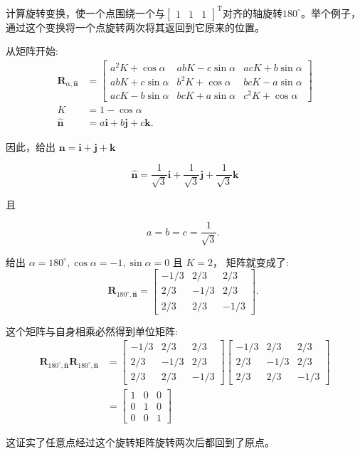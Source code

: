 \begin{example}
    计算旋转变换，使一个点围绕一个与$\left[\begin{array}{lll}1 & 1 & 1\end{array}\right]^{\mathrm {T}}$对齐的轴旋转$180^{\circ}$。举个例子，通过这个变换将一个点旋转两次将其返回到它原来的位置。
    
    从矩阵开始:
    $$
    \begin{aligned}
    \mathbf{R}_{\alpha, \hat{\mathbf{n}}} & =\left[\begin{array}{ccc}
    a^{2} K+\cos \alpha & a b K-c \sin \alpha & a c K+b \sin \alpha \\
    a b K+c \sin \alpha & b^{2} K+\cos \alpha & b c K-a \sin \alpha \\
    a c K-b \sin \alpha & b c K+a \sin \alpha & c^{2} K+\cos \alpha
    \end{array}\right] \\
    K & =1-\cos \alpha \\
    \hat{\mathbf{n}} & =a \mathbf{i}+b \mathbf{j}+c \mathbf{k} .
    \end{aligned}
    $$
    
    因此，给出 $\mathbf{n}=\mathbf{i}+\mathbf{j}+\mathbf{k}$
    
    $$
    \hat{\mathbf{n}}=\frac{1}{\sqrt{3}} \mathbf{i}+\frac{1}{\sqrt{3}} \mathbf{j}+\frac{1}{\sqrt{3}} \mathbf{k}
    $$
    
    且
    
    $$
    a=b=c=\frac{1}{\sqrt{3}} \text {. }
    $$
    
    给出 $\alpha=180^{\circ}, \cos \alpha=-1, \sin \alpha=0$ 且 $K=2$， 矩阵就变成了:
    $$
    \mathbf{R}_{180^{\circ}, \hat{\mathbf{n}}}=\left[\begin{array}{ccc}
    -1 / 3 & 2 / 3 & 2 / 3 \\
    2 / 3 & -1 / 3 & 2 / 3 \\
    2 / 3 & 2 / 3 & -1 / 3
    \end{array}\right] \text {. }
    $$
    
    这个矩阵与自身相乘必然得到单位矩阵:
    $$
    \begin{aligned}
    \mathbf{R}_{180^{\circ}, \hat{\mathbf{n}}} \mathbf{R}_{180^{\circ}, \hat{\mathbf{n}}} & =\left[\begin{array}{ccc}
    -1 / 3 & 2 / 3 & 2 / 3 \\
    2 / 3 & -1 / 3 & 2 / 3 \\
    2 / 3 & 2 / 3 & -1 / 3
    \end{array}\right]\left[\begin{array}{ccc}
    -1 / 3 & 2 / 3 & 2 / 3 \\
    2 / 3 & -1 / 3 & 2 / 3 \\
    2 / 3 & 2 / 3 & -1 / 3
    \end{array}\right] \\
    & =\left[\begin{array}{ccc}
    1 & 0 & 0 \\
    0 & 1 & 0 \\
    0 & 0 & 1
    \end{array}\right]
    \end{aligned}
    $$
    
    这证实了任意点经过这个旋转矩阵旋转两次后都回到了原点。
\end{example}
